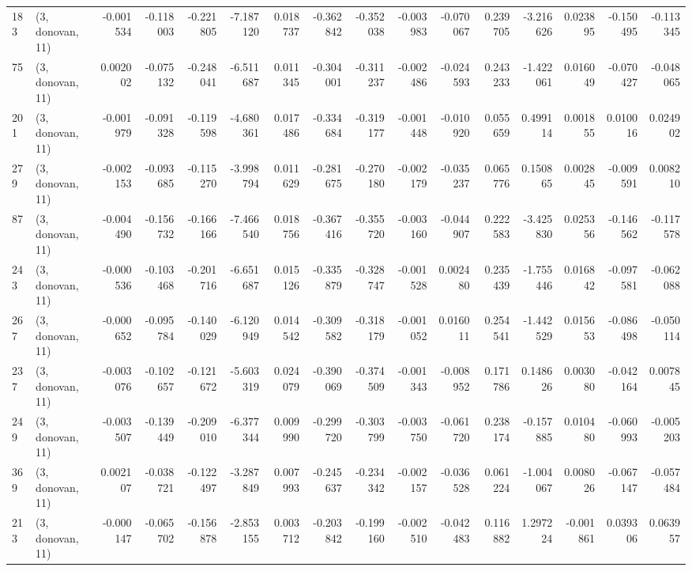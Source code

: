 \begin{tabular}{llrrrrrrrrrrrrrr}
183 &  (3, donovan, 11) &  -0.001534 & -0.118003 & -0.221805 &   -7.187120 &  0.018737 &  -0.362842 & -0.352038 & -0.003983 & -0.070067 &  0.239705 &   -3.216626 &  0.023895 & -0.150495 & -0.113345 \\
75  &  (3, donovan, 11) &   0.002002 & -0.075132 & -0.248041 &   -6.511687 &  0.011345 &  -0.304001 & -0.311237 & -0.002486 & -0.024593 &  0.243233 &   -1.422061 &  0.016049 & -0.070427 & -0.048065 \\
201 &  (3, donovan, 11) &  -0.001979 & -0.091328 & -0.119598 &   -4.680361 &  0.017486 &  -0.334684 & -0.319177 & -0.001448 & -0.010920 &  0.055659 &    0.499114 &  0.001855 &  0.010016 &  0.024902 \\
279 &  (3, donovan, 11) &  -0.002153 & -0.093685 & -0.115270 &   -3.998794 &  0.011629 &  -0.281675 & -0.270180 & -0.002179 & -0.035237 &  0.065776 &    0.150865 &  0.002845 & -0.009591 &  0.008210 \\
87  &  (3, donovan, 11) &  -0.004490 & -0.156732 & -0.166166 &   -7.466540 &  0.018756 &  -0.367416 & -0.355720 & -0.003160 & -0.044907 &  0.222583 &   -3.425830 &  0.025356 & -0.146562 & -0.117578 \\
243 &  (3, donovan, 11) &  -0.000536 & -0.103468 & -0.201716 &   -6.651687 &  0.015126 &  -0.335879 & -0.328747 & -0.001528 &  0.002480 &  0.235439 &   -1.755446 &  0.016842 & -0.097581 & -0.062088 \\
267 &  (3, donovan, 11) &  -0.000652 & -0.095784 & -0.140029 &   -6.120949 &  0.014542 &  -0.309582 & -0.318179 & -0.001052 &  0.016011 &  0.254541 &   -1.442529 &  0.015653 & -0.086498 & -0.050114 \\
237 &  (3, donovan, 11) &  -0.003076 & -0.102657 & -0.121672 &   -5.603319 &  0.024079 &  -0.390069 & -0.374509 & -0.001343 & -0.008952 &  0.171786 &    0.148626 &  0.003080 & -0.042164 &  0.007845 \\
249 &  (3, donovan, 11) &  -0.003507 & -0.139449 & -0.209010 &   -6.377344 &  0.009990 &  -0.299720 & -0.303799 & -0.003750 & -0.061720 &  0.238174 &   -0.157885 &  0.010480 & -0.060993 & -0.005203 \\
369 &  (3, donovan, 11) &   0.002107 & -0.038721 & -0.122497 &   -3.287849 &  0.007993 &  -0.245637 & -0.234342 & -0.002157 & -0.036528 &  0.061224 &   -1.004067 &  0.008026 & -0.067147 & -0.057484 \\
213 &  (3, donovan, 11) &  -0.000147 & -0.065702 & -0.156878 &   -2.853155 &  0.003712 &  -0.203842 & -0.199160 & -0.002510 & -0.042483 &  0.116882 &    1.297224 & -0.001861 &  0.039306 &  0.063957 \\

\end{tabular}

